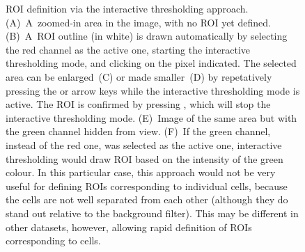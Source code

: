 \begin{figure}[!b]
\begin{tabular}{cccccc}
\end{tabular}
\caption{\label{fig:roi-interactive5}%
ROI definition via the interactive thresholding approach. (A)~A~zoomed-in area in the image, with no ROI yet defined. (B)~A~ROI outline (in white) is drawn automatically by selecting the red channel as the active one, starting the interactive thresholding mode, and clicking on the pixel indicated. The selected area can be enlarged~(C) or made smaller~(D) by repetatively pressing the  or  arrow keys while the interactive thresholding mode is active. The ROI is confirmed by pressing , which will stop the interactive thresholding mode. (E)~Image of the same area but with the green channel hidden from view. (F)~If the green channel, instead of the red one, was selected as the active one, interactive thresholding would draw ROI based on the intensity of the green colour. In this particular case, this approach would not be very useful for defining ROIs corresponding to individual cells, because the cells are not well separated from each other (although they do stand out relative to the background filter). This may be different in other datasets, however, allowing rapid definition of ROIs corresponding to cells.}
\end{figure}







